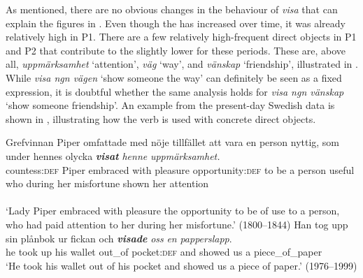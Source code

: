\documentclass[output=paper]{langscibook}
\begin{document}
\begin{table}
\caption{Frequency measures of the verb-specific DOC with \textit{visa} ‘show’}
\label{tab:valdeson:13}
\end{table}

As mentioned, there are no obvious changes in the behaviour of \textit{visa} that can explain the figures in . Even though the  has increased over time, it was already relatively high in P1. There are a few relatively high-frequent direct objects in P1 and P2 that contribute to the slightly lower  for these periods. These are, above all, \textit{uppmärksamhet} ‘attention’, \textit{väg} ‘way’, and \textit{vänskap} ‘friendship’, illustrated in . While \textit{visa ngn vägen} ‘show someone the way’ can definitely be seen as a fixed expression, it is doubtful whether the same analysis holds for \textit{visa ngn vänskap} ‘show someone friendship’. An example from the present-day Swedish data is shown in , illustrating how the verb is used with concrete direct objects.


\ea \label{ex:valdeson:18}
\gll Grefvinnan    Piper  omfattade    med  nöje       tillfället att vara en person nyttig, som under hennes  olycka \textbf{\textit{visat}} \textit{henne}      \textit{uppmärksamhet.}\\
  countess:\textsc{def}  Piper  embraced    with  pleasure  opportunity:\textsc{def} to  be       a     person useful who during her misfortune shown   her       attention\\\\
\glt ‘Lady Piper embraced with pleasure the opportunity to be of use to a person, who had paid attention to her during her misfortune.’ (1800–1844)
\ex \label{ex:valdeson:19}
\gll Han  tog     upp    sin    plånbok  ur     fickan {och} \textbf{\textit{visade}} \textit{oss}   \textit{en}  \textit{papperslapp}.\\
  he       took    up       his     wallet     out\_of pocket:\textsc{def} and    showed    us    a  piece\_of\_paper\\
\glt `He took his wallet out of his pocket and showed us a piece of paper.’ (1976–1999)
\z
\end{document}
